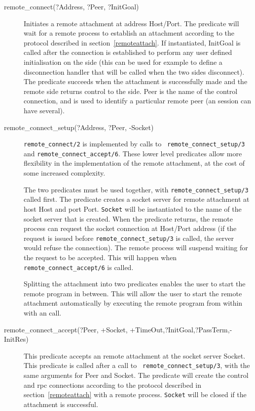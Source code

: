 \begin{description}
\item[remote_connect(?Address, ?Peer, ?InitGoal)] 
Initiates a remote attachment at address Host/Port. The predicate
will wait for a remote process to establish an attachment according to the
protocol described in section~\ref{remoteattach}. If instantiated, InitGoal
is called after the connection is established to perform any user defined
initialisation on the {\eclipse} side (this can be used for example to
define a disconnection handler that will be called when the two sides
disconnect). The predicate succeeds 
when the attachment is successfully made and the remote side returns
control to the {\eclipse} side. Peer is the name of the control
connection, and is used to identify a particular remote peer (an
{\eclipse} session can have several).

\item[remote_connect_setup(?Address, ?Peer, -Socket)]
{\tt remote_connect/2} is implemented by calls to {\tt
remote_connect_setup/3} and {\tt remote_connect_accept/6}. These lower
level predicates allow more flexibility in the implementation of the remote
attachment, at the cost of some increased complexity.

The two predicates must be used together, with {\tt remote_connect_setup/3}
called first. The predicate creates a socket server for remote attachment
at host Host and port Port. {\tt Socket} will be instantiated to the name of
the socket server that is created. When the predicate returns, the remote process
can request the socket connection at Host/Port address (if the request is
issued before {\tt remote_connect_setup/3} is called, the server would
refuse the connection). The remote process will suspend waiting for the
request to be accepted. This will happen when {\tt remote_connect_accept/6}
is called.

Splitting the attachment into two predicates enables the user to start the
remote program in between. This will allow the user to start the remote
attachment automatically by executing the remote program from within
{\eclipse} with an  call. 

\item[remote_connect_accept(?Peer, +Socket, +TimeOut,?InitGoal,?PassTerm,-InitRes)]
This predicate accepts an remote attachment at the socket server Socket.
This predicate is called after a call to {\tt
remote_connect_setup/3}, with the same arguments for Peer
and Socket. The predicate will create the control and rpc connections
according to the protocol described in section~\ref{remoteattach} with a
remote process. {\tt Socket} will be closed if the attachment is
successful. 


\end{description}

